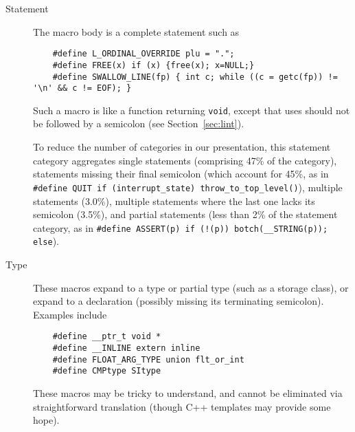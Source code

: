 \documentclass[10pt]{article}
\begin{document}
\begin{description}
\item[Statement]\label{item:statement-category}
  The macro body is a complete statement such as
\begin{verbatim}
    #define L_ORDINAL_OVERRIDE plu = ".";
    #define FREE(x) if (x) {free(x); x=NULL;}
    #define SWALLOW_LINE(fp) { int c; while ((c = getc(fp)) != '\n' && c != EOF); }
\end{verbatim}
  Such a macro is like a function returning {\tt void}, except that uses
  should not be followed by a semicolon (see Section~\ref{sec:lint}).
    
  To reduce the number of categories in our presentation, this statement
  category aggregates single statements (comprising 47\% of the category),
  statements missing their final semicolon (which account for 45\%, as in
  {\tt \#define QUIT if (\verb|interrupt_state|)
  \verb|throw_to_top_level|()}), multiple statements (3.0\%), multiple
statements where the last one lacks its semicolon (3.5\%), and partial
statements (less than 2\% of the statement category, as in {\tt \#define
ASSERT(p) if (!(p)) botch(\verb|__STRING|(p)); else}).

\item[Type] 
  These macros expand to a type or partial type (such as a storage class),
  or expand to a declaration (possibly missing its terminating semicolon).
  Examples include
\begin{verbatim}
    #define __ptr_t void *
    #define __INLINE extern inline
    #define FLOAT_ARG_TYPE union flt_or_int
    #define CMPtype SItype
\end{verbatim}
  These macros may be tricky to understand, and cannot be eliminated via
  straightforward translation (though C++ templates may provide some hope).




\end{description}
\end{document}

